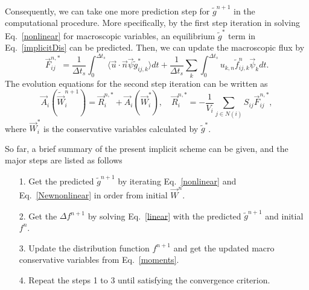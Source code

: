 \documentclass[3p,12pt]{elsarticle}
\begin{document}
	Consequently, we can take one more prediction step for $\tilde{g}^{n+1}$ in the computational procedure. More specifically,
	by the first step iteration in solving Eq.~\eqref{nonlinear} for macroscopic variables, an equilibrium $\tilde{g}^{*}$ term in Eq.~\eqref{implicitDis} can be predicted. Then, we can update the macroscopic flux by
	\begin{equation}
		\vec{F}_{ij}^{n,*} =  \frac{1}{\Delta t_s}\int_0^{\Delta t_s} \langle \vec{u}\cdot \vec{n} \vec{\psi} \tilde{g}_{ij,k}^{*} \rangle dt  + \frac{1}{\Delta t_s}\sum_k \int_0^{\Delta t_s}u_{k,n}\tilde{f}_{ij,k}^{n}\vec{\psi}_{k}dt .
	\end{equation}
	The evolution equations for the second step iteration can be written as
	\begin{equation}
		\vec{A}_i\left( \tilde{\vec{W}}_{i}^{n+1}\right) =\vec{R}_i^{n,*} +  \vec{A}_i\left( \vec{W}_{i}^{*}\right) , \quad \vec{R}_i^{n,*} = -\frac{1}{V_i}\sum_{j\in N(i)}S_{ij}\vec{F}_{ij}^{n,*} ,
		\label{Newnonlinear}\end{equation}
	where $ \vec{W}_{i}^{*}$ is the conservative variables calculated by  $\tilde{g}^{*}$.
	
	So far, a brief summary of the present implicit scheme can be given, and the major steps are listed as follows
	\begin{itemize}
		\item[1.]  Get the predicted $\tilde{g}^{n+1}$ by iterating Eq.~\eqref{nonlinear} and Eq.~\eqref{Newnonlinear} in order from initial $\vec{W}^{n}$.
		\item[2.]  Get the $\Delta f^{n+1}$ by solving Eq.~\eqref{linear} with the predicted $\tilde{g}^{n+1}$ and initial $f^{n}$.
		\item[3.]  Update the distribution function $f^{n+1}$ and get the updated macro conservative variables from Eq.~\eqref{moments}.
		\item[4.] Repeat the steps 1 to 3 until satisfying the convergence criterion.
	\end{itemize}
	
\end{document}
